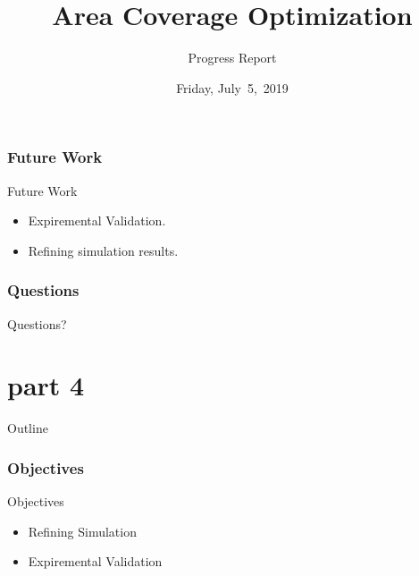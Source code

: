 \documentclass{beamer}
\begin{document}
\section{Future Work}
\begin{frame}{Future Work}
\begin{itemize}
\item Expiremental Validation.
\item Refining simulation results. 
\end{itemize}
\end{frame}
\section*{Questions}
\begin{frame}
\begin{LARGE}
\begin{center}
Questions?
\end{center}
\end{LARGE}
\end{frame}
\part{part 4}
\title{Area Coverage Optimization}
\subtitle{Progress Report}
\date[July~5,~2019]{Friday, July~5,~2019}
\begin{frame}
\maketitle
\end{frame}
\begin{frame}{Outline}
  \tableofcontents
  \end{frame}
\section{Objectives}
\begin{frame}{Objectives}
\begin{itemize}
\item Refining Simulation
\item Expiremental Validation
\end{itemize}
\end{frame}
\end{document}
